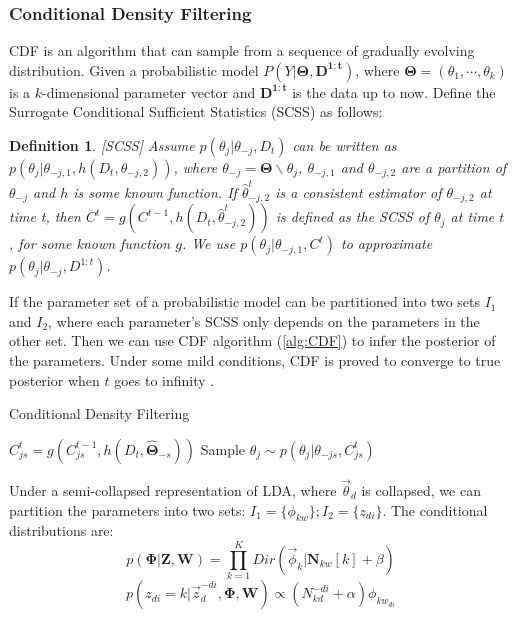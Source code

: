 \documentclass{article} %
\newtheorem{mydef}{Definition}
\begin{document}
\subsubsection{Conditional Density Filtering}
CDF is an algorithm that can sample from a sequence of gradually evolving distribution. Given a probabilistic model $P(Y|\bm{\Theta}, \bm{D^{1:t}})$, where $\bm{\Theta}=(\theta_1,\cdots, \theta_k)$ is a $k$-dimensional parameter vector and $\bm{D^{1:t}}$ is the data up to now. Define the Surrogate Conditional Sufficient Statistics (SCSS) as follows:
\begin{mydef}
\label{def:SCSS}
[SCSS] Assume $p(\theta_j|\theta_{-j},D_t)$ can be written as $p(\theta_j|\theta_{-j,1},h(D_t, \theta_{-j,2}))$, where $\theta_{-j}=\bm{\Theta} \backslash \theta_j$, $\theta_{-j,1}$ and $\theta_{-j,2}$ are a partition of $\theta_{-j}$ and $h$ is some known function. If $\hat{\theta}_{-j,2}^t$ is a consistent estimator of $\theta_{-j,2}$ at time t, then $C^t=g(C^{t-1}, h(D_t, \hat{\theta}_{-j,2}^t))$ is defined as the SCSS of $\theta_j$ at time $t$ , for some known function $g$. We use $p(\theta_j|\theta_{-j,1}, C^t)$ to approximate $p(\theta_j|\theta_{-j},D^{1:t})$.
\end{mydef}

If the parameter set of a probabilistic model can be partitioned into two sets $I_1$ and $I_2$, where each parameter's SCSS only depends on the parameters in the other set. Then we can use CDF algorithm (\ref{alg:CDF}) to infer the posterior of the parameters. Under some mild conditions, CDF is proved to converge to true posterior when $t$ goes to infinity \cite{guhaniyogi2014bayesian}.

\begin{algorithm}[tb]
   \caption{Conditional Density Filtering}
   \label{alg:CDF}
\begin{algorithmic}
   				\STATE $C_{js}^t=g(C_{js}^{t-1}, h(D_t, \hat{\bm{\Theta}}_{-s}))$
   				\STATE Sample $\theta_j \sim p(\theta_j | \theta_{-js}, C_{js}^t)$
   			\ENDFOR
   		\ENDFOR
   \ENDFOR
\end{algorithmic}
\end{algorithm}

Under a semi-collapsed representation of LDA, where $\vec{\theta}_d$ is collapsed, we can partition the parameters into two sets: $I_1=\{\phi_{kw}\}; I_2=\{z_{di}\}$. The conditional distributions are: 
$$p(\bm{\Phi}|\bm{Z}, \bm{W})=\prod_{k=1}^K Dir(\vec{\phi}_k| \bm{N}_{kw}[k]+\beta)$$
$$p(z_{di}=k| \vec{z}_d^{-di}, \bm{\Phi}, \bm{W}) \propto (N_{kd}^{-di}+\alpha) {\phi}_{kw_{di}}$$ 
\end{document}
